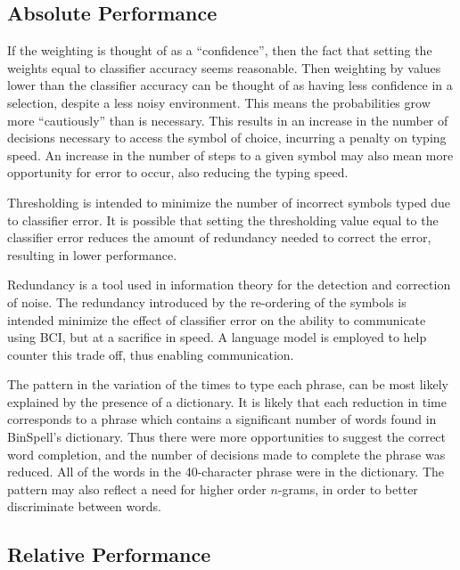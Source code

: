 \documentclass[12pt,titlepage]{article}
\begin{document}
\subsection{Absolute Performance}

If the weighting is thought of as a ``confidence'', then the fact that setting the weights equal to 
classifier accuracy seems reasonable.  Then weighting by values lower than the classifier 
accuracy can be thought of as having less confidence in a selection, despite a less noisy 
environment.  This means the probabilities grow more ``cautiously'' than is necessary.  This 
results in an increase in the number of decisions necessary to access the symbol of choice, 
incurring a penalty on typing speed.  An increase in the number of steps to a given symbol may 
also mean more opportunity for error to occur, also reducing the typing speed.

Thresholding is intended to minimize the number of incorrect symbols typed due to classifier 
error.  It is possible that setting the thresholding value equal to the classifier error reduces the 
amount of redundancy needed to correct the error, resulting in lower performance.

Redundancy is a tool used in information theory for the detection and correction of noise.  The 
redundancy introduced by the re-ordering of the symbols is intended minimize the effect of 
classifier error on the ability to communicate using BCI, but at a sacrifice in speed.  A language 
model is employed to help counter this trade off, thus enabling communication.

The pattern in the variation of the times to type each phrase, can be most likely explained by 
the presence of a dictionary.  It is likely that each reduction in time corresponds to a phrase 
which contains a significant number of words found in BinSpell's dictionary.  Thus there were 
more opportunities to suggest the correct word completion, and the number of decisions made 
to complete the phrase was reduced.  All of the words in the 40-character phrase were in the 
dictionary.  The pattern may also reflect a need for higher order $n$-grams, in order to better 
discriminate between words.

\subsection{Relative Performance}
\end{document}
